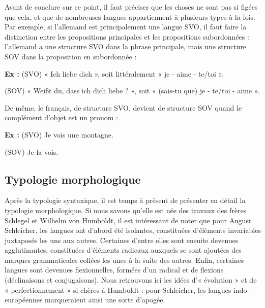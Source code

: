 Avant de conclure sur ce point, il faut préciser que les choses ne sont pas si figées que cela, et que de nombreuses langues appartiennent à plusieurs types à la fois. Par exemple, si l’allemand est principalement une langue SVO, il faut faire la distinction entre les propositions principales et les
propositions subordonnées : l’allemand a une structure SVO dans la phrase principale, mais une structure SOV dans la proposition en subordonnée :

\noindent\textbf{Ex :} (SVO) « Ich liebe dich », soit littéralement « je - aime - te/toi ».

\noindent\hspace*{6mm}(SOV) « Weißt du, dass ich dich liebe ? », soit « (sais-tu que) je - te/toi - aime ».

De même, le français, de structure SVO, devient de structure SOV quand le complément d’objet est un pronom :

\noindent\textbf{Ex :} (SVO) Je vois une montagne.

\noindent\hspace*{6mm}(SOV) Je la vois.

\subsection{Typologie morphologique}
Après la typologie syntaxique, il est temps à présent de présenter en détail la typologie morphologique. Si nous savons qu’elle est née des travaux des frères Schlegel et Wilhelm von Humboldt, il est intéressant de noter que pour August Schleicher, les langues ont d’abord été isolantes, constituées d’éléments invariables juxtaposés les uns aux autres. Certaines d’entre elles sont ensuite devenues agglutinantes, constituées d’éléments radicaux auxquels se sont ajoutées des marques grammaticales collées les unes à la suite des autres. Enfin, certaines langues sont devenues flexionnelles, formées d’un radical et de flexions (déclinaisons et conjugaisons). Nous retrouvons ici les idées d’« évolution » et de « perfectionnement » si chères à Humboldt : pour Schleicher, les langues indo-européennes marqueraient ainsi une sorte d’apogée.

